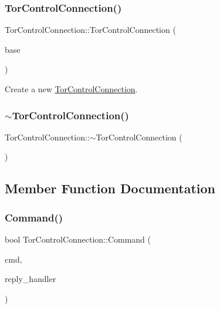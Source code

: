 \subsubsection{\texorpdfstring{Tor\+Control\+Connection()}{TorControlConnection()}}
{\footnotesize\ttfamily Tor\+Control\+Connection\+::\+Tor\+Control\+Connection (\begin{DoxyParamCaption}\item[{struct event\+\_\+base $\ast$}]{base }\end{DoxyParamCaption})}

Create a new \mbox{\hyperlink{class_tor_control_connection}{Tor\+Control\+Connection}}. \mbox{\label{class_tor_control_connection_a323e3a8e9649a74fbf11456fe3e160d3}} 
\subsubsection{\texorpdfstring{$\sim$\+Tor\+Control\+Connection()}{~TorControlConnection()}}
{\footnotesize\ttfamily Tor\+Control\+Connection\+::$\sim$\+Tor\+Control\+Connection (\begin{DoxyParamCaption}{ }\end{DoxyParamCaption})}



\subsection{Member Function Documentation}
\mbox{\label{class_tor_control_connection_a5d0292a1389bb0f78d15fe6c06a2baeb}} 
\subsubsection{\texorpdfstring{Command()}{Command()}}
{\footnotesize\ttfamily bool Tor\+Control\+Connection\+::\+Command (\begin{DoxyParamCaption}\item[{const std\+::string \&}]{cmd,  }\item[{const \mbox{\hyperlink{class_tor_control_connection_a67d9147b8c27456cc7fe15e4d6d8e844}{Reply\+Handler\+CB}} \&}]{reply\+\_\+handler }\end{DoxyParamCaption})}

